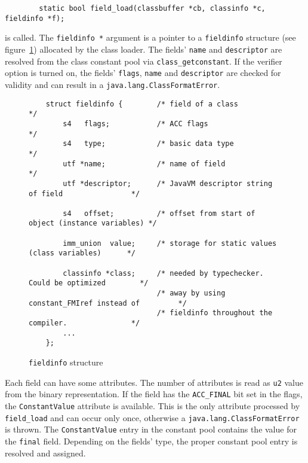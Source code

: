 \begin{verbatim}
        static bool field_load(classbuffer *cb, classinfo *c, fieldinfo *f);
\end{verbatim}

is called. The \texttt{fieldinfo *} argument is a pointer to a
\texttt{fieldinfo} structure (see figure~\ref{fieldinfostructure})
allocated by the class loader. The fields' \texttt{name} and
\texttt{descriptor} are resolved from the class constant pool via
\texttt{class\_getconstant}. If the verifier option is turned on, the
fields' \texttt{flags}, \texttt{name} and \texttt{descriptor} are
checked for validity and can result in a
\texttt{java.lang.ClassFormatError}.

\begin{figure}[h]
\begin{verbatim}
    struct fieldinfo {        /* field of a class                                 */
        s4   flags;           /* ACC flags                                        */
        s4   type;            /* basic data type                                  */
        utf *name;            /* name of field                                    */
        utf *descriptor;      /* JavaVM descriptor string of field                */
	
        s4   offset;          /* offset from start of object (instance variables) */

        imm_union  value;     /* storage for static values (class variables)      */

        classinfo *class;     /* needed by typechecker. Could be optimized        */
                              /* away by using constant_FMIref instead of         */
                              /* fieldinfo throughout the compiler.               */
        ...
    };
\end{verbatim}
\caption{\texttt{fieldinfo} structure}
\label{fieldinfostructure}
\end{figure}

Each field can have some attributes. The number of attributes is read
as \texttt{u2} value from the binary representation. If the field has
the \texttt{ACC\_FINAL} bit set in the flags, the
\texttt{ConstantValue} attribute is available. This is the only
attribute processed by \texttt{field\_load} and can occur only once,
otherwise a \texttt{java.lang.ClassFormatError} is thrown. The
\texttt{ConstantValue} entry in the constant pool contains the value
for the \texttt{final} field. Depending on the fields' type, the
proper constant pool entry is resolved and assigned.


